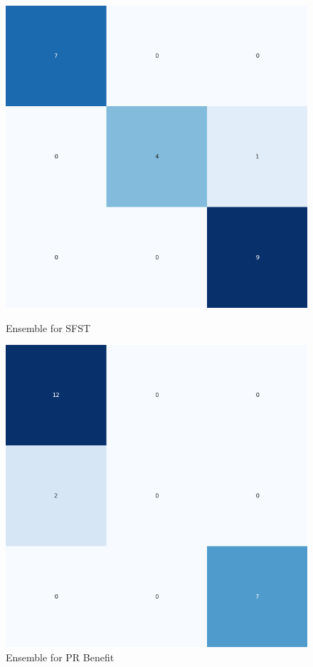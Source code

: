 \begin{figure}[H]
    \centering
    \begin{minipage}[b]{0.45\textwidth}
        \includegraphics[width=\textwidth]{./class_all_section/ensemble_plots/ensemble_confusion_matrix_SFST.png}
        \caption{Ensemble for SFST}
        \label{fig:ensemble_sfst}
    \end{minipage}
    \hfill
    \begin{minipage}[b]{0.45\textwidth}
        \includegraphics[width=\textwidth]{./class_all_section/ensemble_plots/ensemble_confusion_matrix_PR_Benefit.png}
        \caption{Ensemble for PR Benefit}
        \label{fig:ensemble_pr_benefit}
    \end{minipage}
\end{figure}

